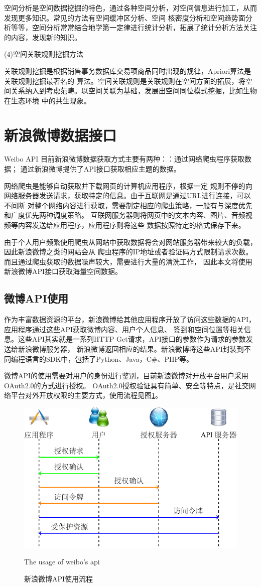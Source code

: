 空间分析是空间数据挖掘的特色，通过各种空间分析，对空间信息进行加工，从而发现更多知识。常见的方法有空间缓冲区分析、空间
核密度分析和空间趋势面分析等等，空间分析常常结合地学第一定律进行统计分析，拓展了统计分析方法关注的内容，发现新的知识\cite{李小文2007地理学第一定律与时空邻近度的提出}。

(4)空间关联规则挖掘方法

关联规则挖掘是根据销售事务数据库交易项商品同时出现的规律\cite{曾玲2005关联规则在空间数据挖掘中的研究}，Apriori算法是关联规则挖掘最著名的
算法。空间关联规则是关联规则在空间方面的拓展，将空间关系纳入到考虑范畴。以空间关联为基础，发展出空间同位模式挖掘，比如生物在生态环境
中的共生现象。

\section{新浪微博数据接口}{Weibo API}
目前新浪微博数据获取方式主要有两种：\cite{廉捷2011新浪微博数据挖掘方案}：通过网络爬虫程序获取数据；
通过新浪微博提供了API接口获取相应主题的数据。

网络爬虫是能够自动获取并下载网页的计算机应用程序\cite{Nemeslaki2011Web}，根据一定
规则不停的向网络服务器发送请求，获取特定的信息。由于互联网是通过URL进行连接，可以不间断
对整个网络内容进行获取，需要制定相应的爬虫策略，一般有与深度优先和广度优先两种调度策略。
互联网服务器则将网页中的文本内容、图片、音频视频等内容发送给应用程序，应用程序则将这些
数据按照特定的格式保存下来。

由于个人用户频繁使用爬虫从网站中获取数据将会对网站服务器带来较大的负载，因此新浪微博之类的网站会从
爬虫程序的IP地址或者验证码方式限制请求次数。而且通过爬虫获取的数据噪声较大，需要进行大量的清洗工作，
因此本文将使用新浪微博API接口获取海量空间数据。
\subsection{微博API使用}
作为丰富数据资源的平台，新浪微博给其他应用程序开放了访问这些数据的API，应用程序通过这些API获取微博内容、用户个人信息、
签到和空间位置等相关信息。这些API其实就是一系列HTTP Get请求，API接口的参数作为请求的参数发送给新浪微博服务器，
新浪微博返回相应的结果。新浪微博将这些API封装到不同编程语言的SDK中，包括了Python、Java，C\#、PHP等。

微博API的使用需要对用户的身份进行鉴别，目前新浪微博对开放平台用户采用OAuth$2.0$的方式进行授权\cite{Recordon2011The}。
OAuth$2.0$授权验证具有简单、安全等特点，是社交网络平台对外开放权限的主要方式，使用流程见图\ref{fig:api}。
\begin{figure}
  \centering
  \includegraphics[width=0.6 \linewidth]{figures/api.pdf}
  \caption{新浪微博API使用流程}{The usage of weibo's api}
  \label{fig:api}
\end{figure}

